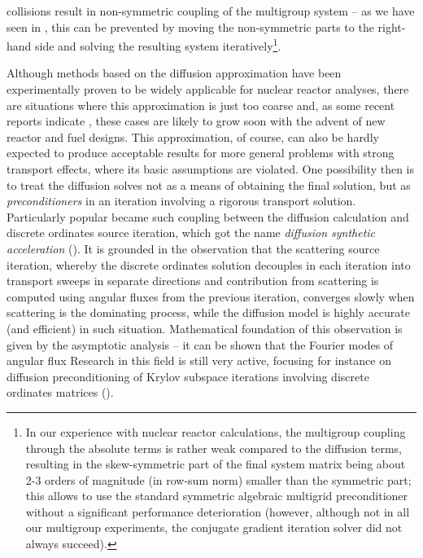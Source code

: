 collisions result in non-symmetric coupling of the multigroup system -- as we have seen in , this can be
prevented by moving the non-symmetric parts to the right-hand side and solving the resulting system
iteratively\footnote{In our experience with nuclear reactor calculations, the multigroup coupling through the absolute
terms is rather weak compared to the diffusion terms, resulting in the skew-symmetric part of the final system matrix
being about 2-3 orders of magnitude (in row-sum norm) smaller than the symmetric part; this allows to use the
standard symmetric algebraic multigrid preconditioner without a significant performance deterioration (however,
although not in all our multigroup experiments, the conjugate gradient iteration solver did not always succeed).}.

Although methods based on the diffusion approximation have been experimentally proven to be widely applicable for
nuclear reactor analyses, there are situations where this approximation is just too coarse and, as some recent reports
indicate \cite{Hejzlar1,Cho1}, these cases are likely to grow soon with the advent of new reactor and fuel designs. This
approximation, of course, can also be hardly expected to produce acceptable results for more general problems with
strong transport effects, where its basic assumptions are violated. One possibility then is to treat the
diffusion solves not as a means of obtaining the final solution, but as \textit{preconditioners} in an iteration
involving a rigorous transport solution. Particularly popular became such coupling between the diffusion calculation and discrete
ordinates source iteration, which got the name \textit{diffusion synthetic acceleration} (\cite{Alcouffe1}). It
is grounded in the observation that the scattering source iteration, whereby the discrete ordinates solution decouples
in each iteration into transport sweeps in separate directions and contribution from scattering is computed using
angular fluxes from the previous iteration, converges slowly when scattering is the dominating process, while the
diffusion model is highly accurate (and efficient) in such situation. Mathematical foundation of this observation is
given by the asymptotic analysis -- it can be shown that the Fourier modes of angular flux Research in this field is
still very active, focusing for instance on diffusion preconditioning of Krylov subspace iterations involving discrete ordinates matrices (\cite[Chap.
1]{Azmy1}).

